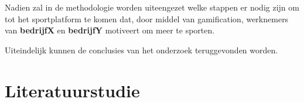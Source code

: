 Nadien zal in de methodologie worden uiteengezet welke stappen er nodig zijn om tot het sportplatform te komen dat, door middel van gamification, werknemers van \textbf{bedrijfX} en \textbf{bedrijfY} motiveert om meer te sporten.

Uiteindelijk kunnen de conclusies van het onderzoek teruggevonden worden.








\section{Literatuurstudie}%
\label{sec:state-of-the-art}

